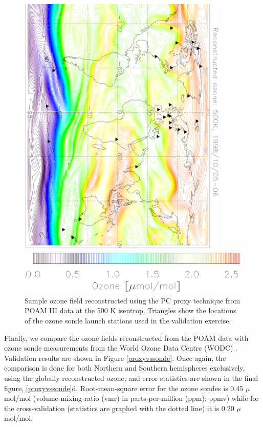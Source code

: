 \begin{figure}
\begin{flushright}
\includegraphics[angle=90,width=0.9\textwidth]{proxyO3.0017.stn.eps}
\end{flushright}
\begin{flushleft}
\includegraphics[width=.9\textwidth]{proxyO3.0017.stn_legend.eps}
\end{flushleft}
\caption{Sample ozone field reconstructed using the PC proxy technique
from POAM III data at the 500 K isentrop.
Triangles show the locations of the ozone sonde launch stations
used in the validation exercise.}\label{sample_ozone}
\end{figure}

Finally, we compare the ozone fields reconstructed from the POAM data 
with ozone sonde measurements from the World Ozone Data Centre (WODC)
\citep{Hare_etal2000}.
Validation results are shown in Figure \ref{proxyvssonde}.
Once again, the comparison is done for both Northern and
Southern hemispheres exclusively, using the globally reconstructed
ozone, and error statistics are shown in the final figure, 
\ref{proxyvssonde}d.
Root-mean-square error for the ozone sondes is 0.45 $\mu$mol/mol
(volume-mixing-ratio (vmr) in parts-per-million (ppm): ppmv) while
for the cross-validation (statistics are graphed with the dotted line) it is 
0.20 $\mu$mol/mol.

